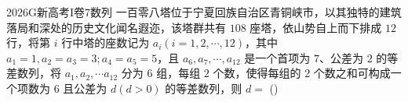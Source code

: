 
\begin{problem}{2026}{G}{新高考I卷}{7}{数列}
一百零八塔位于宁夏回族自治区青铜峡市，以其独特的建筑落局和深处的历史文化闻名遐迩，该塔群共有 $ 108 $ 座塔，依山势自上而下排成 $ 12 $ 行，将第 $ i $ 行中塔的座数记为 $ a_i(i=1,2,\cdots,12) $，其中 $ a_1=1,a_2=a_3=3;a_4=a_5=5 $，且 $ a_6,a_7,\cdots,a_{12} $ 是一个首项为 $ 7 $、公差为 $ 2 $ 的等差数列，将 $ a_1,a_2,\cdots a_{12} $ 分为 $ 6 $ 组，每组 $ 2 $ 个数，使得每组的 $ 2 $ 个数之和可构成一个项数为 $ 6 $ 且公差为 $ d(d>0) $ 的等差数列，则 $ d= $ (\hspace{1cm})
\begin{choices}
\end{choices}
\end{problem}

\begin{answer}
\end{answer}

\begin{solutions}
\end{solutions}